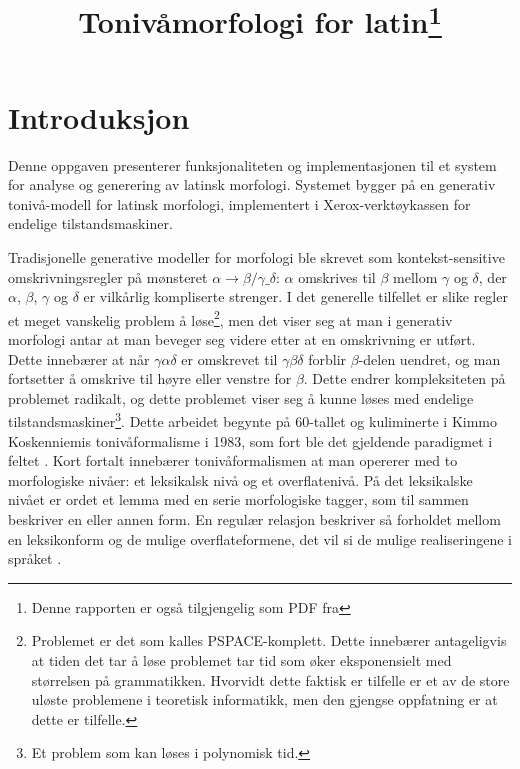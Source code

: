 \documentclass{article}
\title{Toniv\aa{}morfologi for latin\footnote{Denne rapporten er ogs\aa{}
tilgjengelig som PDF fra \link{http://heim.ifi.uio.no/arnskj/latin/report.pdf}}}
\date{} %
\begin{document}
\maketitle

\section{Introduksjon}
Denne oppgaven presenterer funksjonaliteten og implementasjonen til et system
for analyse og generering av latinsk morfologi. Systemet bygger p\aa{} en
generativ toniv\aa{}-modell for latinsk morfologi, implementert i
Xerox-verkt\o{}y\-kassen for endelige tilstandsmaskiner.

Tradisjonelle generative modeller for morfologi ble skrevet som
kontekst-sensitive omskrivningsregler p\aa{} m\o{}nsteret $\alpha \to
\beta/\gamma \_ \delta$: $\alpha$ omskrives til $\beta$ mellom $\gamma$ og
$\delta$, der $\alpha$, $\beta$, $\gamma$ og $\delta$ er vilk\aa{}rlig
kompliserte strenger. I det generelle tilfellet er slike regler et meget
vanskelig problem \aa{} l\o{}se\footnote{Problemet er det som kalles
PSPACE-komplett. Dette inneb\ae{}rer antageligvis at tiden det tar \aa{}
l\o{}se problemet tar tid som \o{}ker eksponensielt med st\o{}rrelsen p\aa{}
grammatikken. Hvorvidt dette faktisk er tilfelle er et av de store ul\o{}ste
problemene i teoretisk informatikk, men den gjengse oppfatning er at dette er
tilfelle.}, men det viser seg at man i generativ morfologi antar at man
beveger seg videre etter at en omskrivning er utf\o{}rt. Dette inneb\ae{}rer
at n\aa{}r $\gamma\alpha\delta$ er omskrevet til $\gamma\beta\delta$ forblir
$\beta$-delen uendret, og man fortsetter \aa{} omskrive til h\o{}yre eller
venstre for $\beta$. Dette endrer kompleksiteten p\aa{} problemet radikalt, og
dette problemet viser seg \aa{} kunne l\o{}ses med endelige
tilstandsmaskiner\footnote{Et problem som kan l\o{}ses i polynomisk tid.}.
Dette arbeidet begynte p\aa{} 60-tallet og kuliminerte i Kimmo Koskenniemis
toniv\aa{}formalisme i 1983, som fort ble det gjeldende paradigmet i feltet
\cite{twolc}. Kort fortalt inneb\ae{}rer toniv\aa{}formalismen at man opererer
med to morfologiske niv\aa{}er: et leksikalsk niv\aa{} og et
overflateniv\aa{}. P\aa{} det leksikalske niv\aa{}et er ordet et lemma med en
serie morfologiske tagger, som til sammen beskriver en eller annen form. En
regul\ae{}r relasjon beskriver s\aa{} forholdet mellom en leksikonform og de
mulige overflateformene, det vil si de mulige realiseringene i spr\aa{}ket
\cite{jnm}.
\end{document}
